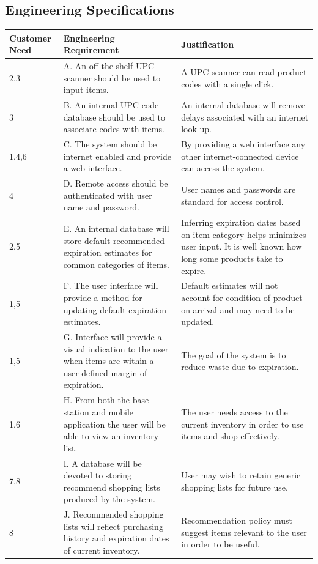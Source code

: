 \documentclass[11pt,letterpaper]{article}
\begin{document}
\subsection{Engineering Specifications}
\begin{table}[h!]
\begin{center}
\begin{tabular}{| p{1.2in} | p{2.5in} |p{2.5in} |}
\hline
Customer Need & Engineering Requirement & Justification \\
\hline
2,3 &A. An off-the-shelf UPC scanner should be used to input items. & A UPC scanner can read product codes with a single click.\\
\hline
3 &B. An internal UPC code database should be used to associate codes with items.&An internal database will remove delays associated with an internet look-up.\\
\hline
1,4,6&C. The system should be internet enabled and provide a web interface.&By providing a web interface any other internet-connected device can access the system.\\
\hline
4&D. Remote access should be authenticated with user name and password.&User names and passwords are standard for access control.\\
\hline
2,5&E. An internal database will store default recommended expiration estimates for common categories of items.&Inferring expiration dates based on item category helps minimizes user input. It is well known how long some products take to expire.\\
\hline
1,5&F. The user interface will provide a method for updating default expiration estimates.&Default estimates will not account for condition of product on arrival and may need to be updated.\\
\hline
1,5&G. Interface will provide a visual indication to the user when items are within a user-defined margin of expiration.&The goal of the system is to reduce waste due to expiration.\\
\hline
1,6&H. From both the base station and mobile application the user will be able to view an inventory list.&The user needs access to the current inventory in order to use items and shop effectively.\\
\hline
7,8&I. A database will be devoted to storing recommend shopping lists produced by the system.&User may wish to retain generic shopping lists for future use.\\
\hline
8&J. Recommended shopping lists will reflect purchasing history and expiration dates of current inventory.&Recommendation policy must suggest items relevant to the user in order to be useful.\\

\end{tabular}
\end{center}
\end{table}
\end{document}
